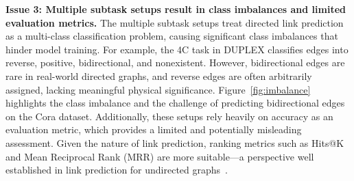 









\textbf{Issue 3: Multiple subtask setups result in class imbalances and limited evaluation metrics.}
The multiple subtask setups treat directed link prediction as a multi-class classification problem, causing significant class imbalances that hinder model training. For example, the 4C task in DUPLEX classifies edges into reverse, positive, bidirectional, and nonexistent. However, bidirectional edges are rare in real-world directed graphs, and reverse edges are often arbitrarily assigned, lacking meaningful physical significance. Figure~\ref{fig:imbalance} highlights the class imbalance and the challenge of predicting bidirectional edges on the Cora dataset. Additionally, these setups rely heavily on accuracy as an evaluation metric, which provides a limited and potentially misleading
assessment. Given the nature of link prediction, ranking metrics such as Hits@K and Mean Reciprocal Rank (MRR) are more suitable—a perspective well established in link prediction for undirected graphs~\cite{li2023evaluating}.

